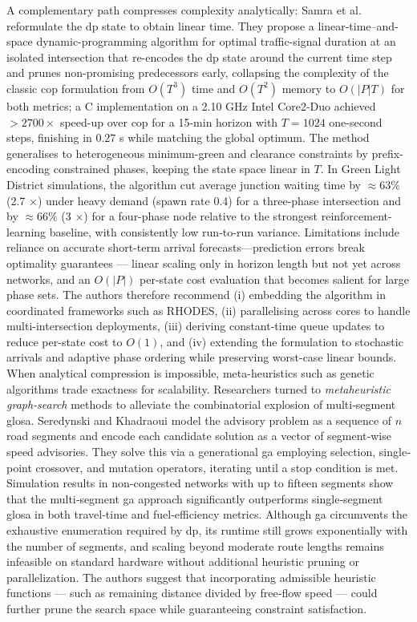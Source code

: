 A complementary path compresses complexity analytically: Samra et al. \cite{Samra2015} reformulate the \ac{dp} state to obtain linear time. They propose a linear-time–and-space dynamic-programming algorithm for optimal traffic-signal duration at an isolated intersection that re-encodes the \ac{dp} state around the current time step and prunes non-promising predecessors early, collapsing the complexity of the classic \ac{cop} formulation from $O(T^{3})$ time and $O(T^{2})$ memory to $O(|P|T)$ for both metrics; a C implementation on a 2.10 GHz Intel Core2-Duo achieved $>2700\times$ speed-up over \ac{cop} for a 15-min horizon with $T\!=\!1024$ one-second steps, finishing in $0.27$ s while matching the global optimum.  The method generalises to heterogeneous minimum-green and clearance constraints by prefix-encoding constrained phases, keeping the state space linear in $T$.  In Green Light District simulations, the algorithm cut average junction waiting time by $\approx63\%$ (2.7 ×) under heavy demand (spawn rate 0.4) for a three-phase intersection and by $\approx66\%$ (3 ×) for a four-phase node relative to the strongest reinforcement-learning baseline, with consistently low run-to-run variance.  Limitations include reliance on accurate short-term arrival forecasts—prediction errors break optimality guarantees --- linear scaling only in horizon length but not yet across networks, and an $O(|P|)$ per-state cost evaluation that becomes salient for large phase sets. The authors therefore recommend (i) embedding the algorithm in coordinated frameworks such as RHODES, (ii) parallelising across cores to handle multi-intersection deployments, (iii) deriving constant-time queue updates to reduce per-state cost to $O(1)$, and (iv) extending the formulation to stochastic arrivals and adaptive phase ordering while preserving worst-case linear bounds.
\mynewline
When analytical compression is impossible, meta-heuristics such as genetic algorithms trade exactness for scalability. Researchers turned to \emph{metaheuristic graph‐search} methods to alleviate the combinatorial explosion of multi‐segment \ac{glosa}. Seredynski and Khadraoui \cite{Seredynski2013} model the advisory problem as a sequence of $n$ road segments and encode each candidate solution as a vector of segment‐wise speed advisories. They solve this via a generational \ac{ga} employing selection, single‐point crossover, and mutation operators, iterating until a stop condition is met. Simulation results in non‐congested networks with up to fifteen segments show that the multi‐segment \ac{ga} approach significantly outperforms single‐segment \ac{glosa} in both travel‐time and fuel‐efficiency metrics. Although \ac{ga} circumvents the exhaustive enumeration required by \ac{dp}, its runtime still grows exponentially with the number of segments, and scaling beyond moderate route lengths remains infeasible on standard hardware without additional heuristic pruning or parallelization. The authors suggest that incorporating admissible heuristic functions --- such as remaining distance divided by free‐flow speed --- could further prune the search space while guaranteeing constraint satisfaction. 
